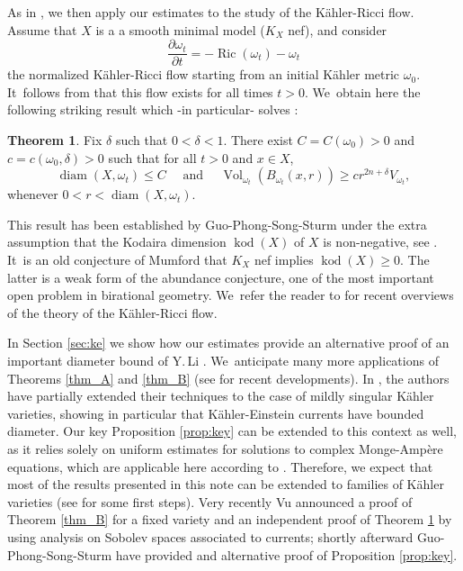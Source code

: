 \documentclass[11pt]{article}
\numberwithin{equation}{section}
\DeclareMathOperator{\diam}{diam}
\DeclareMathOperator{\kod}{kod}
\DeclareMathOperator{\Ric}{Ric}
\DeclareMathOperator{\Vol}{Vol}
\theoremstyle{definition}
\newtheorem{thmA}{Theorem}
\begin{document}
As in \cite{GPSS22}, we then apply our estimates to the study of the Kähler-Ricci flow.
Assume that $X$ is a a smooth minimal model ($K_X$ nef), and consider\vspace*{-3pt}
\[
\frac{\partial \omega_t}{\partial t}=-\Ric(\omega_t)-\omega_t
\]
the normalized Kähler-Ricci flow starting from an initial Kähler metric $\omega_0$. It~follows from \cite{TZ06} that this flow exists for all times $t>0$. We~obtain here the following striking result which -in particular- solves \cite[Conj.\,6.2]{Tos18}:

\begin{thmA}\label{thm_C}
Fix $\delta$ such that $0<\delta<1$.
There exist $C=C(\omega_0)>0$ and $c=c(\omega_0,\delta)>0$ such that for all $t>0$ and $x \in X$,\vspace*{-3pt}
\[
\diam(X,\omega_t) \leq C
\quad \text{ and } \quad
\Vol_{\omega_t}(B_{\omega_t}(x,r)) \geq c r^{2n+\delta} V_{\omega_t},
\]
whenever $0<r<\diam(X,\omega_t)$.
\end{thmA}

This result has been established by Guo-Phong-Song-Sturm under the extra assumption that
the Kodaira dimension $\kod(X)$ of $X$ is non-negative, see \cite[Th.\,2.3]{GPSS22}. It~is an old conjecture of Mumford that $K_X$ nef implies $\kod(X) \geq 0$.
The latter is a weak form of the abundance conjecture, one of the most important open problem in
birational geometry. We~refer the reader to \cite{Tos18,Tos24} for recent overviews of the theory of the Kähler-Ricci flow.

In Section \ref{sec:ke} we show how our estimates provide an alternative proof of an important
diameter bound of Y.\,Li \cite[Th.\,1.4]{Li23}. We~anticipate many more applications of Theorems \ref{thm_A} and \ref{thm_B} (see \cite{CGNPPW23,GP24} for recent developments).
In \cite{GPSS23}, the authors have partially extended their techniques
to the case of mildly singular Kähler varieties, showing in particular that Kähler-Einstein currents have
bounded diameter. Our key Proposition \ref{prop:key} can be extended to this context as well, as it relies solely
on uniform estimates for solutions to complex Monge-Ampère equations,
which are applicable here according to \cite[Th.\,1.9]{DnGG23}.
Therefore, we expect that most of the results presented in this note can be extended to families of
Kähler varieties (see \cite[\S 3]{GP24} for some first steps).
Very recently Vu \cite{V24} announced a proof of Theorem \ref{thm_B} for a fixed variety
and an independent proof of Theorem \ref{thm_C} by using analysis on Sobolev spaces associated to currents;
shortly afterward Guo-Phong-Song-Sturm \cite{GPSS24} have provided and alternative proof of Proposition \ref{prop:key}.
\end{document}
